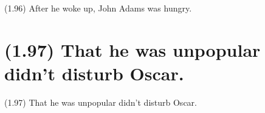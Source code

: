 \documentclass{article}
\begin{document}
\bigbreak
\begin{enumerate*}
\item[(1.96)] After he woke up, John Adams was hungry.
\end{enumerate*}
\bigbreak

\bigbreak
\begin{minipage}{\textwidth}
\end{minipage}
\bigbreak

\clearpage

%
%

\section*{(1.97) That he was unpopular didn't disturb Oscar.}

\bigbreak
\begin{enumerate*}
\item[(1.97)] That he was unpopular didn't disturb Oscar.
\end{enumerate*}
\bigbreak
\end{document}
